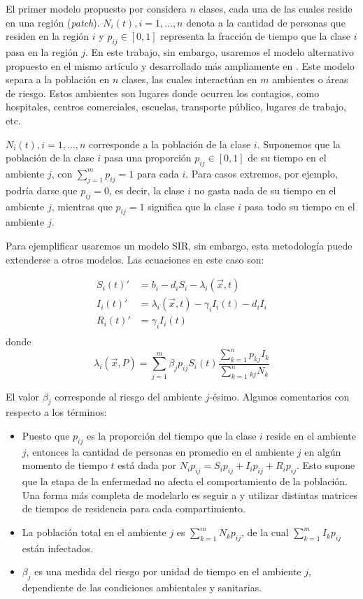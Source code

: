 El primer modelo propuesto por \cite{Bichara2015} considera \(n\) clases, cada una de las cuales reside en una región (\textit{patch}). \(N_i(t), i = 1, \dots, n\) denota a la cantidad de personas que residen en la región \(i\) y \(p_{ij} \in [0,1]\) representa la fracción de tiempo que la clase \(i\) pasa en la región \(j\). En este trabajo, sin embargo, usaremos el modelo alternativo propuesto en el mismo artículo y desarrollado más ampliamente en \cite{Bichara2018}. Este modelo separa a la población en \(n\) clases, las cuales interactúan en \(m\) ambientes o áreas de riesgo. Estos ambientes son lugares donde ocurren los contagios, como hospitales, centros comerciales, escuelas, transporte público, lugares de trabajo, etc.

\(N_i(t), i = 1, \dots, n\) corresponde a la población de la clase \(i\). Suponemos que la población de la clase \(i\) pasa una proporción \(p_{ij} \in [0,1]\) de su tiempo en el ambiente \(j\), con \(\sum_{j = 1}^{m} p_{ij} = 1\) para cada \(i\). Para casos extremos, por ejemplo, podría darse que \(p_{ij} = 0\), es decir, la clase \(i\) no gasta nada de su tiempo en el ambiente \(j\), mientras que \(p_{ij} = 1\) significa que la clase \(i\) pasa todo su tiempo en el ambiente \(j\). 

Para ejemplificar usaremos un modelo SIR, sin embargo, esta metodología puede extenderse a otros modelos. Las ecuaciones en este caso son:

\[
\begin{aligned}
S_i(t)' &=  b_i - d_i S_i - {\lambda_i(\vec{x}, t) } \\
I_i(t)' &= {\lambda_i(\vec{x}, t) } - \gamma_i I_i(t) - d_i I_i\\
R_i(t)' &= \gamma_i I_i(t)\\ 
\end{aligned}
\]
donde 
\[\lambda_i(\vec{x}, P) = \sum_{j=1}^m \beta_{j}p_{ij}S_i(t)\frac{\sum_{k=1}^{n}p_{kj} I_k}{\sum_{k=1}^{n}_{kj}N_k}\]

El valor \(\beta_j\) corresponde al riesgo del ambiente \(j\)-ésimo. Algunos comentarios con respecto a los términos: 

\begin{itemize}
\item Puesto que \(p_{ij}\) es la proporción del tiempo que la clase \(i\) reside en el ambiente \(j\), entonces la cantidad de personas en promedio en el ambiente \(j\) en algún momento de tiempo \(t\) está dada por \(N_i p_{ij} = S_i p_{ij} + I_i p_{ij} + R_i p_{ij}\). Esto supone que la etapa de la enfermedad no afecta el comportamiento de la población. Una forma más completa de modelarlo es seguir a \cite{Bichara2018} y utilizar distintas matrices de tiempos de residencia para cada compartimiento.
\item La población total en el ambiente \(j\) es \(\sum_{k = 1}^m N_k p_{ij}\), de la cual \(\sum_{k = 1}^m I_k p_{ij}\) están infectados.
\item \(\beta_j\) es una medida del riesgo por unidad de tiempo en el ambiente \(j\), dependiente de las condiciones ambientales y sanitarias.
\end{itemize}

